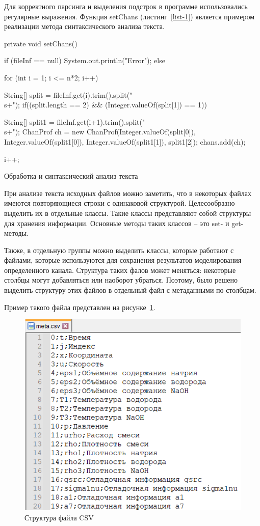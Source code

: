 Для корректного парсинга и выделения подстрок в программе использовались регулярные выражения. Функция setChans (листинг~\ref{list-1}) является примером реализации метода синтаксического анализа текста. 

\begin{Program}
	\begin{MyCode}
		private void setChans(){
			if (fileInf == null) {
				System.out.println("Error");
			} else {
				
				
				for (int i = 1; i <= n*2; i++) {
					String[] split = fileInf.get(i).trim().split("\\s+");
					if((split.length == 2) && (Integer.valueOf(split[1]) == 1)) {
						
						String[] split1 = fileInf.get(i+1).trim().split("\\s+");
						ChanProf ch = new ChanProf(Integer.valueOf(split[0]), Integer.valueOf(split1[0]), Integer.valueOf(split1[1]), split1[2]);
						chans.add(ch);
						
					}
					i++;
					
				}
			}
		}
			
		\end{MyCode}
		\caption{Обработка и синтаксический анализ текста}\label{list-1}
	\end{Program}


При анализе текста исходных файлов можно заметить, что в некоторых файлах имеются повторяющиеся строки с одинаковой структурой. Целесообразно выделить их в отдельные классы. Такие классы представляют собой структуры для хранения информации. Основные методы таких классов – это set- и get-методы.

Также, в отдельную группы можно выделить классы, которые работают с файлами, которые используются для сохранения результатов моделирования определенного канала. Структура таких фалов может меняться: некоторые столбцы могут добавляться или наоборот убраться. Поэтому, было решено выделить структуру этих файлов в отдельный файл с метаданными по столбцам. 

Пример такого файла представлен на рисунке~\ref{fig:meta}.
\begin{figure}[H]
	\centering
	\includegraphics[width=0.7\linewidth]{pics/meta}
	\caption{Структура файла CSV}
	\label{fig:meta}
\end{figure}

